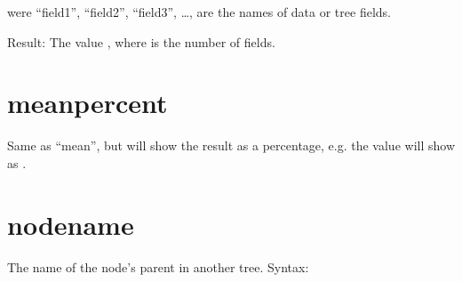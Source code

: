 \documentclass[letterpaper,10pt,english]{sphinxmanual}
\begin{document}
\begin{sphinxVerbatim}[commandchars=\\\{\}]
 
     
     \PYG{p}{[}  \PYG{p}{]}
     \PYG{p}{[} \PYG{p}{]}
     \PYG{p}{[}\PYG{p}{]}
     \PYG{p}{[}\PYG{p}{]}
\end{sphinxVerbatim}

\sphinxAtStartPar
were “field1”, “field2”, “field3”, …, are the names of data or tree fields.

\sphinxAtStartPar
Result: The value , where  is the number of fields.


\section{mean\sphinxhyphen{}percent}
\label{\detokenize{tree-fields:mean-percent}}
\sphinxAtStartPar
Same as “mean”, but will show the result as a percentage, e.g. the value  will show as .


\section{node\sphinxhyphen{}name}
\label{\detokenize{tree-fields:node-name}}
\sphinxAtStartPar
The name of the node’s parent in another tree.
Syntax:

\begin{sphinxVerbatim}[commandchars=\\\{\}]
 
     
     \PYG{p}{[}\PYG{p}{]}
     \PYG{p}{[}\PYG{p}{]}
     \PYG{p}{[}\PYG{p}{]}
     \PYG{p}{[}\PYG{p}{]}
\end{sphinxVerbatim}
\end{document}
